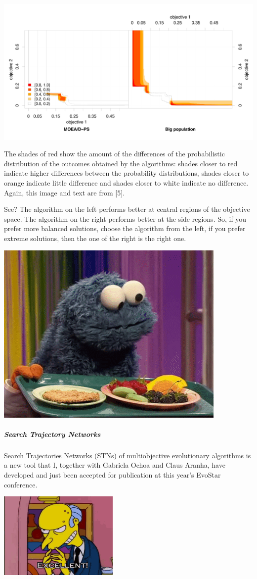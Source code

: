 \documentclass[
]{article}
\begin{document}
\begin{center}\includegraphics[width=0.65\linewidth]{imgs/eaf_UF6_big_vs_ps} \end{center}

The shades of red show the amount of the differences of the
probabilistic distribution of the outcomes obtained by the algorithms:
shades closer to red indicate higher differences between the probability
distributions, shades closer to orange indicate little difference and
shades closer to white indicate no difference. Again, this image and
text are from {[}5{]}.

See? The algorithm on the left performs better at central regions of the
objective space. The algorithm on the right performs better at the side
regions. So, if you prefer more balanced solutions, choose the algorithm
from the left, if you prefer extreme solutions, then the one of the
right is the right one.

\begin{center}\includegraphics[width=0.4\linewidth]{gifs/choices} \end{center}

\hypertarget{search-trajectory-networks}{%
\subparagraph{Search Trajectory
Networks}\label{search-trajectory-networks}}

Search Trajectories Networks (STNs) of multiobjective evolutionary
algorithms is a new tool that I, together with Gabriela Ochoa and Claus
Aranha, have developed and just been accepted for publication at this
year's EvoStar conference.

\begin{center}\includegraphics[width=0.4\linewidth]{gifs/thats_good} \end{center}
\end{document}
